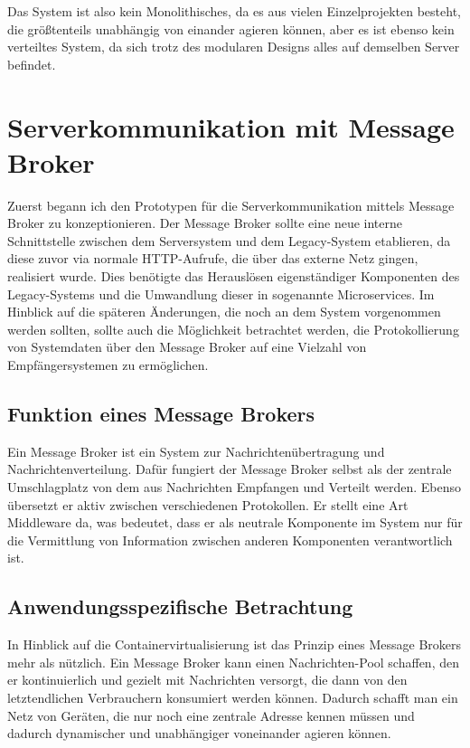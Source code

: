 \documentclass[12pt,a4paper]{scrartcl}
\begin{document}
Das System ist also kein Monolithisches, da es aus vielen Einzelprojekten besteht, die größtenteils unabhängig von einander agieren können, aber es ist ebenso kein verteiltes System, da sich trotz des modularen Designs alles auf demselben Server befindet.

\section{Serverkommunikation mit Message Broker} \label{rabbit}
Zuerst begann ich den Prototypen für die Serverkommunikation mittels Message Broker zu konzeptionieren. Der Message Broker sollte eine neue interne Schnittstelle zwischen dem Serversystem und dem Legacy-System etablieren, da diese zuvor via normale HTTP-Aufrufe, die über das externe Netz gingen, realisiert wurde. Dies benötigte das Herauslösen eigenständiger Komponenten des Legacy-Systems und die Umwandlung dieser in sogenannte Microservices. Im Hinblick auf die späteren Änderungen, die noch an dem System vorgenommen werden sollten, sollte auch die Möglichkeit betrachtet werden, die Protokollierung von Systemdaten über den Message Broker auf eine Vielzahl von Empfängersystemen zu ermöglichen. 

\subsection{Funktion eines Message Brokers}
Ein Message Broker ist ein System zur Nachrichtenübertragung und Nachrichtenverteilung. Dafür fungiert der Message Broker selbst als der zentrale Umschlagplatz von dem aus Nachrichten Empfangen und Verteilt werden. Ebenso übersetzt er aktiv zwischen verschiedenen Protokollen\cite{mesBro}. Er stellt eine Art Middleware da, was bedeutet, dass er als neutrale Komponente im System nur für die Vermittlung von Information zwischen anderen Komponenten verantwortlich ist.

\subsection{Anwendungsspezifische Betrachtung}
In Hinblick auf die Containervirtualisierung ist das Prinzip eines Message Brokers mehr als nützlich.
Ein Message Broker kann einen Nachrichten-Pool schaffen, den er kontinuierlich und gezielt mit Nachrichten versorgt, die dann von den letztendlichen Verbrauchern konsumiert werden können. Dadurch schafft man ein Netz von Geräten, die nur noch eine zentrale Adresse kennen müssen und dadurch dynamischer und unabhängiger voneinander agieren können. 
\end{document}
